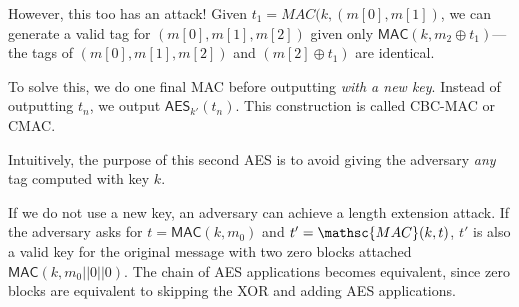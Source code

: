 However, this too has an attack! Given $t_1 = MAC(k, (m[0], m[1])$, we can generate a valid tag for $(m[0], m[1], m[2])$ given only $\mathsf{MAC}(k, m_2 \oplus t_1)$---the tags of $(m[0], m[1], m[2])$ and $(m[2] \oplus t_1)$ are identical.

	To solve this, we do one final MAC before outputting \emph{with a new key}. Instead of outputting $t_n$, we output $\mathsf{AES}_{k'}(t_n)$. This construction is called CBC-MAC or CMAC. %

	Intuitively, the purpose of this second AES is to avoid giving the adversary \textit{any} tag computed with key $k$. 

	If we do not use a new key, an adversary can achieve a length extension attack. If the adversary asks for $t = \mathsf{MAC}(k, m_0)$ and $t' = \mathsc{MAC}(k, t)$, $t'$ is also a valid key for the original message with two zero blocks attached $\mathsf{MAC}(k, m_0 || 0 || 0)$. The chain of AES applications becomes equivalent, since zero blocks are equivalent to skipping the XOR and adding AES applications.

